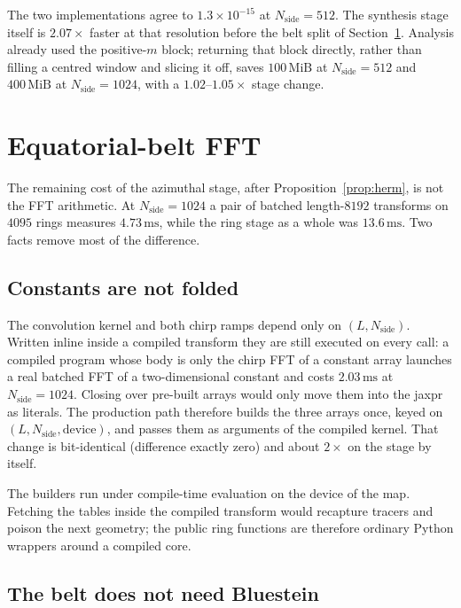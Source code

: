 \documentclass[usenatbib,useAMS]{mnras}
\begin{document}
The two implementations agree to $1.3\times10^{-15}$ at $N_{\mathrm{side}}=512$. The synthesis stage itself is $2.07\times$ faster at that resolution before the belt split of Section~\ref{sec:belt}. Analysis already used the positive-$m$ block; returning that block directly, rather than filling a centred window and slicing it off, saves $100\,\mathrm{MiB}$ at $N_{\mathrm{side}}=512$ and $400\,\mathrm{MiB}$ at $N_{\mathrm{side}}=1024$, with a $1.02$--$1.05\times$ stage change.

\section{Equatorial-belt FFT}
\label{sec:belt}

The remaining cost of the azimuthal stage, after Proposition~\ref{prop:herm}, is not the FFT arithmetic. At $N_{\mathrm{side}}=1024$ a pair of batched length-$8192$ transforms on $4095$ rings measures $4.73\,\mathrm{ms}$, while the ring stage as a whole was $13.6\,\mathrm{ms}$. Two facts remove most of the difference.

\subsection{Constants are not folded}

The convolution kernel and both chirp ramps depend only on $(L,N_{\mathrm{side}})$. Written inline inside a compiled transform they are still executed on every call: a compiled program whose body is only the chirp FFT of a constant array launches a real batched FFT of a two-dimensional constant and costs $2.03\,\mathrm{ms}$ at $N_{\mathrm{side}}=1024$. Closing over pre-built arrays would only move them into the jaxpr as literals. The production path therefore builds the three arrays once, keyed on $(L,N_{\mathrm{side}},\mathrm{device})$, and passes them as arguments of the compiled kernel. That change is bit-identical (difference exactly zero) and about $2\times$ on the stage by itself.

The builders run under compile-time evaluation on the device of the map. Fetching the tables inside the compiled transform would recapture tracers and poison the next geometry; the public ring functions are therefore ordinary Python wrappers around a compiled core.

\subsection{The belt does not need Bluestein}
\end{document}
